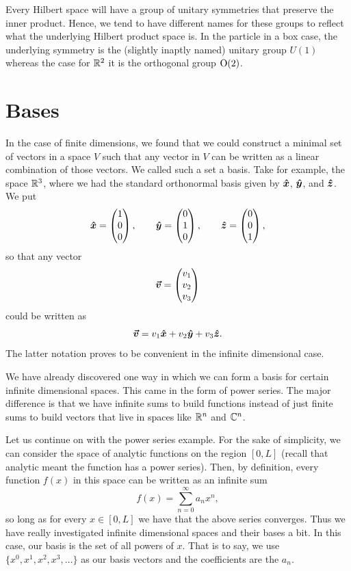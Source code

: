 Every Hilbert space will have a group of unitary symmetries that preserve the inner product. Hence, we tend to have different names for these groups to reflect what the underlying Hilbert product space is. In the particle in a box case, the underlying symmetry is the (slightly inaptly named) unitary group $U(1)$ whereas the case for $\mathbb{R}^2$ it is the orthogonal group $\mathrm{O}(2)$.

\section{Bases}

In the case of finite dimensions, we found that we could construct a minimal set of vectors in a space $V$ such that any vector in $V$ can be written as a linear combination of those vectors.  We called such a set a basis.  Take for example, the space $\mathbb{R}^3$, where we had the standard orthonormal basis given by $\boldsymbol{\hat{x}}$, $\boldsymbol{\hat{y}}$, and $\boldsymbol{\hat{z}}$.  We put
\[
\boldsymbol{\hat{x}} = \begin{pmatrix} 1 \\ 0 \\ 0 \end{pmatrix}, \qquad \boldsymbol{\hat{y}} = \begin{pmatrix} 0 \\ 1 \\ 0 \end{pmatrix}, \qquad \boldsymbol{\hat{z}} = \begin{pmatrix} 0 \\ 0 \\ 1 \end{pmatrix},
\]
so that any vector
\[
\boldsymbol{\boldsymbol{\vec{v}}} = \begin{pmatrix} v_1 \\ v_2 \\ v_3 \end{pmatrix}
\]
could be written as
\[
\boldsymbol{\boldsymbol{\vec{v}}} = v_1 \boldsymbol{\hat{x}} + v_2 \boldsymbol{\hat{y}} + v_3 \boldsymbol{\hat{z}}.
\]
The latter notation proves to be convenient in the infinite dimensional case.

We have already discovered one way in which we can form a basis for certain infinite dimensional spaces. This came in the form of power series. The major difference is that we have infinite sums to build functions instead of just finite sums to build vectors that live in spaces like $\mathbb{R}^n$ and $\mathbb{C}^n$. 

Let us continue on with the power series example.  For the sake of simplicity, we can consider the space of analytic functions on the region $[0,L]$ (recall that analytic meant the function has a power series).  Then, by definition, every function $f(x)$ in this space can be written as an infinite sum
\[
f(x)=\sum_{n=0}^\infty a_n x^n,
\]
so long as for every $x\in [0,L]$ we have that the above series converges. Thus we have really investigated infinite dimensional spaces and their bases a bit.  In this case, our basis is the set of all powers of $x$. That is to say, we use $\{x^0,x^1,x^2,x^3,\dots\}$ as our basis vectors and the coefficients are the $a_n$.  

